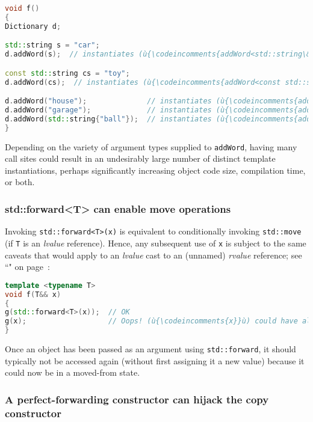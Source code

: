 \begin{lstlisting}[language=C++]
void f()
{
Dictionary d;

std::string s = "car";
d.addWord(s);  // instantiates (ù{\codeincomments{addWord<std::string\&>}}ù)

const std::string cs = "toy";
d.addWord(cs);  // instantiates (ù{\codeincomments{addWord<const std::string\&>}}ù)

d.addWord("house");              // instantiates (ù{\codeincomments{addWord<char const(\&)[6]>}}ù)
d.addWord("garage");             // instantiates (ù{\codeincomments{addWord<char const(\&)[7]>}}ù)
d.addWord(std::string{"ball"});  // instantiates (ù{\codeincomments{addWord<std::string\&\&>}}ù)
}
\end{lstlisting}

\noindent Depending on the variety of argument types supplied to \texttt{addWord},
having many call sites could result in an undesirably large number of
distinct template instantiations, perhaps significantly increasing
object code size, compilation time, or both.

\subsubsection[{\tt std::forward<T>} can enable move operations]{{\SubsubsecCode std::forward<T>} can enable move operations}\label{std::forward<t>-can-enable-move-operations}

Invoking \texttt{std::forward<T>(x)} is equivalent to conditionally
invoking \texttt{std::move} (if \texttt{T} is an
\emph{lvalue} reference). Hence, any subsequent use of \texttt{x} is
subject to the same caveats that would apply to an \emph{lvalue} cast to
an (unnamed) \emph{rvalue} reference; see ``" on page~\pageref{Rvalue-References}:

\begin{lstlisting}[language=C++]
template <typename T>
void f(T&& x)
{
g(std::forward<T>(x));  // OK
g(x);                   // Oops! (ù{\codeincomments{x}}ù) could have already been moved from.
}
\end{lstlisting}

\noindent Once an object has been passed as an argument using
\texttt{std::forward}, it should typically not be accessed again
(without first assigning it a new value) because it could now be in a
moved-from state.

\subsubsection[A perfect-forwarding constructor can hijack the copy constructor]{A perfect-forwarding constructor can hijack the copy constructor}\label{a-perfect-forwarding-constructor-can-hijack-the-copy-constructor}

